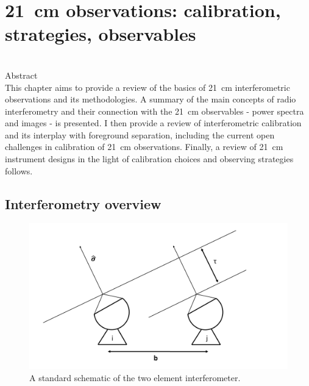 \chapter{21~cm observations: calibration, strategies, observables}
\label{chapter:bernardi}

\begin{bf}
  \author{Gianni Bernardi (INAF-IRA \& Rhodes University)}\\
  
Abstract\\

This chapter aims to provide a review of the basics of 21~cm interferometric observations and its methodologies. A summary of the main concepts of radio interferometry and their connection with the 21~cm observables - power spectra and images - is presented. I then provide a review of interferometric calibration and its interplay with foreground separation, including the current open challenges in calibration of 21~cm observations. Finally, a review of 21~cm instrument designs in the light of calibration choices and observing strategies follows.
\end{bf}





\section{Interferometry overview}

\begin{figure}[]
\begin{center}
\includegraphics[width=1.\textwidth]{Bernardi/2_element_interferometer_2}
\end{center}
\caption{A standard schematic of the two element interferometer.}
\label{fig:fig1}
\end{figure}

